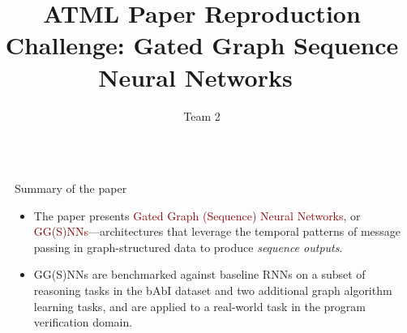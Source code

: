 \documentclass[final,hyperref={pdfpagelabels=false}]{beamer}
\title{ATML Paper Reproduction Challenge: Gated Graph Sequence Neural Networks~\cite{DBLP:journals/corr/LiTBZ15}} %
\author{Team 2}
\institute{Department of Computer Science, University of Oxford}
\newcommand{\shrink}{-15pt}
\begin{document}

\begin{frame}[t] %

\begin{columns}[t] %

  \begin{column}{.02\textwidth}\end{column} %


  \begin{column}{.3\textwidth} %
    \vspace{\shrink}          
    \begin{block}{Summary of the paper}
      
      \begin{itemize}
          \item The paper presents \textcolor{darkred}{Gated Graph (Sequence) Neural Networks}, or \textcolor{darkred}{GG(S)NNs}—architectures that leverage the temporal patterns of message passing in graph-structured data to produce \textit{sequence outputs}.
          \item GG(S)NNs are benchmarked against baseline RNNs on a subset of reasoning tasks in the bAbI dataset and two additional graph algorithm learning tasks, and are applied to a real-world task in the program verification domain.
      \end{itemize}

    \end{block}
    

    
        

\end{column}
\end{columns}
\end{frame}
\end{document}
